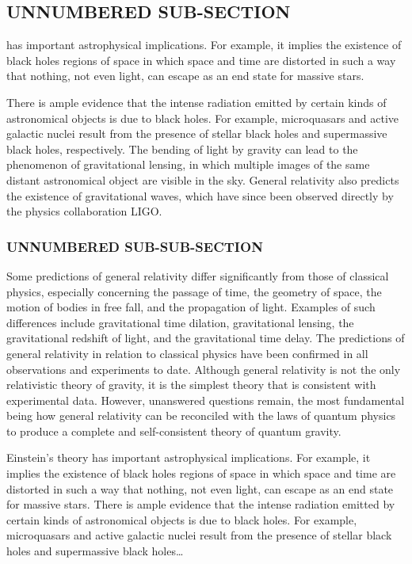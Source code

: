 \subsection*{UNNUMBERED SUB-SECTION}

\begin{warn}
 has important astrophysical implications. For example, it
implies the existence of black holes regions of space in which space and time
are distorted in such a way that nothing, not even light, can escape as an
end state for massive stars.
\end{warn}

There is ample evidence that the intense radiation
emitted by certain kinds of astronomical objects is due to black holes. For
example, microquasars and active galactic nuclei result from the presence of
stellar black holes and supermassive black holes, respectively. The bending of
light by gravity can lead to the phenomenon of gravitational lensing, in which
multiple images of the same distant astronomical object are visible in the sky.
General relativity also predicts the existence of gravitational waves, which
have since been observed directly by the physics collaboration LIGO.
\subsubsection*{UNNUMBERED SUB-SUB-SECTION}
Some predictions of general relativity differ significantly from those of
classical physics, especially concerning the passage of time, the geometry of
space, the motion of bodies in free fall, and the propagation of light. Examples
of such differences include gravitational time dilation, gravitational lensing,
the gravitational redshift of light, and the gravitational time delay. The
predictions of general relativity in relation to classical physics have been
confirmed in all observations and experiments to date. Although general
relativity is not the only relativistic theory of gravity, it is the simplest
theory that is consistent with experimental data. However, unanswered questions
remain, the most fundamental being how general relativity can be reconciled with
the laws of quantum physics to produce a complete and self-consistent theory of
quantum gravity.

Einstein's theory has important astrophysical implications. For example, it
implies the existence of black holes regions of space in which space and time
are distorted in such a way that nothing, not even light, can escape as an
end state for massive stars. There is ample evidence that the intense radiation
emitted by certain kinds of astronomical objects is due to black holes. For
example, microquasars and active galactic nuclei result from the presence of
stellar black holes and supermassive black holes\ldots


